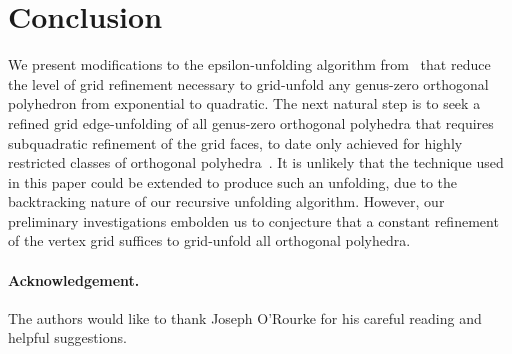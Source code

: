 \documentclass[11pt]{article}
\begin{document}
\section{Conclusion}
We present modifications to the epsilon-unfolding algorithm from~\cite{Damian-Flatland-O'Rourke-2007-epsilon} that reduce the level of grid
refinement necessary to grid-unfold any
genus-zero orthogonal polyhedron from exponential to quadratic.
The next natural step is to seek a refined grid edge-unfolding of all genus-zero
orthogonal polyhedra that requires subquadratic refinement of the
grid faces, to date only achieved for highly restricted classes of
orthogonal polyhedra~\cite{Biedl-Demaine-Demaine-Lubiw-Overmars-O'Rourke-Robbins-Whitesides-1998,Damian-Flatland-O'Rourke-2008-manhattan,Damian-Meijer-2004-orthostacks}.
It is unlikely
that the technique used in this paper could be extended to produce such an unfolding, due
to the backtracking nature of our recursive unfolding algorithm. However, our preliminary
investigations embolden us
to conjecture that a constant refinement of the vertex grid
suffices to grid-unfold all orthogonal polyhedra.


\paragraph{Acknowledgement.} The authors would like to thank Joseph O'Rourke for his careful 
reading and helpful suggestions.



\end{document}
